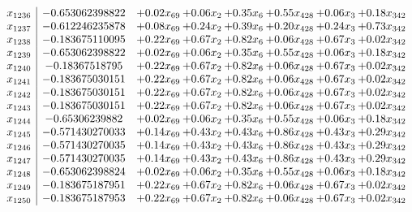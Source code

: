 \documentclass[8pt]{article}
\begin{document}
\[\begin{array}{c| c c@{\hskip 2pt} c@{\hskip 2pt} c@{\hskip 2pt} c@{\hskip 2pt} c@{\hskip 2pt} c@{\hskip 2pt} }
 x_{1236}   &  -0.653062398822 & +  0.02 x_{69} & +  0.06 x_{2} & +  0.35 x_{6} & +  0.55 x_{428} & +  0.06 x_{3} & +  0.18 x_{342}\\
 x_{1237}   &  -0.612246235878 & +  0.08 x_{69} & +  0.24 x_{2} & +  0.39 x_{6} & +  0.20 x_{428} & +  0.24 x_{3} & +  0.73 x_{342}\\
 x_{1238}   &  -0.183675110095 & +  0.22 x_{69} & +  0.67 x_{2} & +  0.82 x_{6} & +  0.06 x_{428} & +  0.67 x_{3} & +  0.02 x_{342}\\
 x_{1239}   &  -0.653062398822 & +  0.02 x_{69} & +  0.06 x_{2} & +  0.35 x_{6} & +  0.55 x_{428} & +  0.06 x_{3} & +  0.18 x_{342}\\
 x_{1240}   &  -0.18367518795 & +  0.22 x_{69} & +  0.67 x_{2} & +  0.82 x_{6} & +  0.06 x_{428} & +  0.67 x_{3} & +  0.02 x_{342}\\
 x_{1241}   &  -0.183675030151 & +  0.22 x_{69} & +  0.67 x_{2} & +  0.82 x_{6} & +  0.06 x_{428} & +  0.67 x_{3} & +  0.02 x_{342}\\
 x_{1242}   &  -0.183675030151 & +  0.22 x_{69} & +  0.67 x_{2} & +  0.82 x_{6} & +  0.06 x_{428} & +  0.67 x_{3} & +  0.02 x_{342}\\
 x_{1243}   &  -0.183675030151 & +  0.22 x_{69} & +  0.67 x_{2} & +  0.82 x_{6} & +  0.06 x_{428} & +  0.67 x_{3} & +  0.02 x_{342}\\
 x_{1244}   &  -0.65306239882 & +  0.02 x_{69} & +  0.06 x_{2} & +  0.35 x_{6} & +  0.55 x_{428} & +  0.06 x_{3} & +  0.18 x_{342}\\
 x_{1245}   &  -0.571430270033 & +  0.14 x_{69} & +  0.43 x_{2} & +  0.43 x_{6} & +  0.86 x_{428} & +  0.43 x_{3} & +  0.29 x_{342}\\
 x_{1246}   &  -0.571430270035 & +  0.14 x_{69} & +  0.43 x_{2} & +  0.43 x_{6} & +  0.86 x_{428} & +  0.43 x_{3} & +  0.29 x_{342}\\
 x_{1247}   &  -0.571430270035 & +  0.14 x_{69} & +  0.43 x_{2} & +  0.43 x_{6} & +  0.86 x_{428} & +  0.43 x_{3} & +  0.29 x_{342}\\
 x_{1248}   &  -0.653062398824 & +  0.02 x_{69} & +  0.06 x_{2} & +  0.35 x_{6} & +  0.55 x_{428} & +  0.06 x_{3} & +  0.18 x_{342}\\
 x_{1249}   &  -0.183675187951 & +  0.22 x_{69} & +  0.67 x_{2} & +  0.82 x_{6} & +  0.06 x_{428} & +  0.67 x_{3} & +  0.02 x_{342}\\
 x_{1250}   &  -0.183675187953 & +  0.22 x_{69} & +  0.67 x_{2} & +  0.82 x_{6} & +  0.06 x_{428} & +  0.67 x_{3} & +  0.02 x_{342}\\

\end{array}\]
\end{document}
